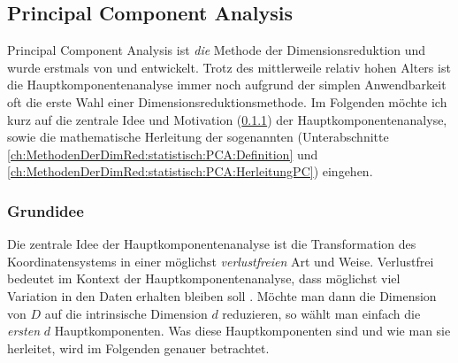 \subsection{Principal Component Analysis}
\label{ch:MethodenDerDimRed:statistisch:PCA}

Principal Component Analysis ist \textit{die} Methode der Dimensionsreduktion und wurde erstmals
von \textcite{Pearson.1901} und \textcite{Hotelling.1933} entwickelt. Trotz des mittlerweile
relativ hohen Alters ist die Hauptkomponentenanalyse immer noch aufgrund der simplen Anwendbarkeit
oft die erste Wahl einer Dimensionsreduktionsmethode. Im Folgenden möchte ich kurz auf die zentrale
Idee und Motivation (\ref{ch:MethodenDerDimRed:statistisch:PCA:Grundidee}) der
Hauptkomponentenanalyse, sowie die mathematische Herleitung der sogenannten
 (Unterabschnitte \ref{ch:MethodenDerDimRed:statistisch:PCA:Definition}
und \ref{ch:MethodenDerDimRed:statistisch:PCA:HerleitungPC}) eingehen.

\subsubsection{Grundidee}
\label{ch:MethodenDerDimRed:statistisch:PCA:Grundidee}
Die zentrale Idee der Hauptkomponentenanalyse ist die Transformation des Koordinatensystems in einer möglichst \textit{verlustfreien} Art und Weise. Verlustfrei bedeutet im Kontext der Hauptkomponentenanalyse, dass möglichst viel Variation in den Daten erhalten bleiben soll \parencite[vgl.][1]{Jolliffe.2002}. Möchte man dann die Dimension von $D$ auf die intrinsische
Dimension $d$ reduzieren, so wählt man einfach die \textit{ersten} $d$ Hauptkomponenten.
Was diese Hauptkomponenten sind und wie man sie herleitet, wird im Folgenden genauer betrachtet.

